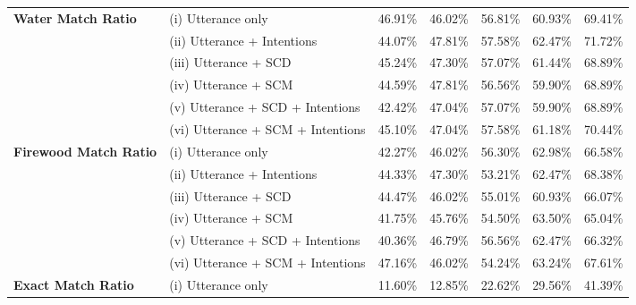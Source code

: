 \begin{table*}[ht]
\begin{tabular}{llccccc}
\midrule
\multirow{6}{*}{\textbf{Water Match Ratio}} & (i) Utterance only & 46.91\% & 46.02\% & 56.81\% & 60.93\% & 69.41\% \\
 & (ii) Utterance + Intentions & \cellcolor{red!25}44.07\% & \cellcolor{green!25}47.81\% & \cellcolor{green!25}57.58\% & \cellcolor{green!25}62.47\% & \cellcolor{green!25}71.72\% \\
 & (iii) Utterance + SCD & \cellcolor{red!25}45.24\% & \cellcolor{green!25}47.30\% & \cellcolor{green!25}57.07\% & \cellcolor{green!25}61.44\% & \cellcolor{red!25}68.89\% \\
 & (iv) Utterance + SCM & \cellcolor{red!25}44.59\% & \cellcolor{green!25}47.81\% & \cellcolor{red!25}56.56\% & \cellcolor{red!25}59.90\% & \cellcolor{red!25}68.89\% \\
 & (v) Utterance + SCD + Intentions & \cellcolor{red!25}42.42\% & \cellcolor{green!25}47.04\% & \cellcolor{green!25}57.07\% & \cellcolor{red!25}59.90\% & \cellcolor{red!25}68.89\% \\
 & (vi) Utterance + SCM + Intentions & \cellcolor{red!25}45.10\% & \cellcolor{green!25}47.04\% & \cellcolor{green!25}57.58\% & \cellcolor{green!25}61.18\% & \cellcolor{green!25}70.44\% \\
\midrule
\multirow{6}{*}{\textbf{Firewood Match Ratio}} & (i) Utterance only & 42.27\% & 46.02\% & 56.30\% & 62.98\% & 66.58\% \\
 & (ii) Utterance + Intentions & \cellcolor{green!25}44.33\% & \cellcolor{green!25}47.30\% & \cellcolor{red!25}53.21\% & \cellcolor{red!25}62.47\% & \cellcolor{green!25}68.38\% \\
 & (iii) Utterance + SCD & \cellcolor{green!25}44.47\% & \cellcolor{red!25}46.02\% & \cellcolor{red!25}55.01\% & \cellcolor{red!25}60.93\% & \cellcolor{red!25}66.07\% \\
 & (iv) Utterance + SCM & \cellcolor{red!25}41.75\% & \cellcolor{red!25}45.76\% & \cellcolor{red!25}54.50\% & \cellcolor{green!25}63.50\% & \cellcolor{red!25}65.04\% \\
 & (v) Utterance + SCD + Intentions & \cellcolor{red!25}40.36\% & \cellcolor{green!25}46.79\% & \cellcolor{green!25}56.56\% & \cellcolor{red!25}62.47\% & \cellcolor{red!25}66.32\% \\
 & (vi) Utterance + SCM + Intentions & \cellcolor{green!25}47.16\% & \cellcolor{red!25}46.02\% & \cellcolor{red!25}54.24\% & \cellcolor{green!25}63.24\% & \cellcolor{green!25}67.61\% \\
\midrule
\multirow{6}{*}{\textbf{Exact Match Ratio}} & (i) Utterance only & 11.60\% & 12.85\% & 22.62\% & 29.56\% & 41.39\% \\

\end{tabular}
\end{table*}
